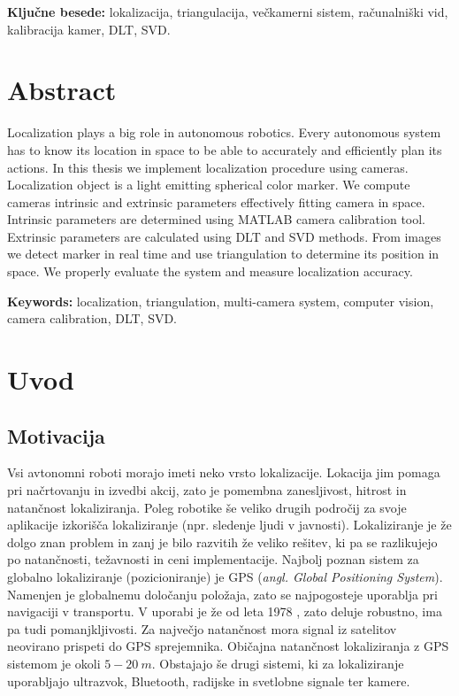 \documentclass[a4paper, 12pt]{book}
\newcommand{\tkeywords}{lokalizacija, triangulacija, večkamerni sistem, računalniški vid, kalibracija kamer, DLT, SVD}
\newcommand{\tkeywordsEn}{localization, triangulation, multi-camera system, computer vision, camera calibration, DLT, SVD}
\newcommand{\clearemptydoublepage}{\newpage{\pagestyle{empty}\cleardoublepage}}
\begin{document}
\noindent\textbf{Ključne besede:} \tkeywords.
\clearemptydoublepage

\chapter*{Abstract}
Localization plays a big role in autonomous robotics. Every autonomous system has to know its location in space to be able to accurately and efficiently plan its actions.
In this thesis we implement localization procedure using cameras. Localization object is a light emitting spherical color marker. We compute cameras intrinsic and extrinsic parameters effectively fitting camera in space. Intrinsic parameters are determined using MATLAB camera calibration tool. Extrinsic parameters are calculated using DLT and SVD methods. From images we detect marker in real time and use triangulation to determine its position in space. We properly evaluate the system and measure localization accuracy.
\bigskip

\noindent\textbf{Keywords:} \tkeywordsEn.
\clearemptydoublepage

\mainmatter
\setcounter{page}{1}
\pagestyle{fancy}

\chapter{Uvod}
\section{Motivacija}
Vsi avtonomni roboti morajo imeti neko vrsto lokalizacije. Lokacija jim pomaga pri načrtovanju in izvedbi akcij, zato je pomembna zanesljivost, hitrost in natančnost lokaliziranja. Poleg robotike še veliko drugih področij za svoje aplikacije izkorišča lokaliziranje (npr. sledenje ljudi v javnosti).
Lokaliziranje je že dolgo znan problem in zanj je bilo razvitih že veliko rešitev, ki pa se razlikujejo po natančnosti, težavnosti in ceni implementacije. Najbolj poznan sistem za globalno lokaliziranje (pozicioniranje) je GPS (\emph{angl. Global Positioning System}). Namenjen je globalnemu določanju položaja, zato se najpogosteje uporablja pri navigaciji v transportu. V uporabi je že od leta 1978 \cite{wiki:gps}, zato deluje robustno, ima pa tudi pomanjkljivosti. Za največjo natančnost mora signal iz satelitov neovirano prispeti do GPS sprejemnika. Običajna natančnost lokaliziranja z GPS sistemom je okoli $5-20 \ m$. Obstajajo še drugi sistemi, ki za lokaliziranje uporabljajo ultrazvok, Bluetooth, radijske in svetlobne signale ter kamere.
\end{document}

